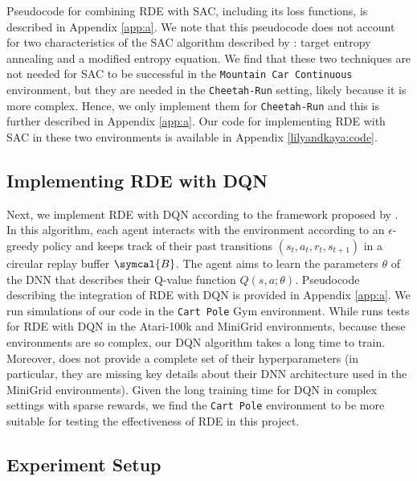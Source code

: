 \documentclass[base]{subfiles}
\begin{document}
Pseudocode for combining RDE with SAC, including its loss functions, is described in Appendix \ref{app:a}. 
We note that this pseudocode does not account for two characteristics of the SAC algorithm described by \cite{sac}: target entropy annealing and a modified entropy equation. 
We find that these two techniques are not needed for SAC to be successful in the \texttt{Mountain Car Continuous} environment, but they are needed in the \texttt{Cheetah-Run} setting, likely because it is more complex.
Hence, we only implement them for \texttt{Cheetah-Run} and this is further described in Appendix \ref{app:a}.
Our code for implementing RDE with SAC in these two environments is available in Appendix \ref{lilyandkaya:code}.

\subsection{Implementing RDE with DQN}

Next, we implement RDE with DQN according to the framework proposed by \cite{minh2015}.
In this algorithm, each agent interacts with the environment according to an $\epsilon$-greedy policy and keeps track of their past transitions $(s_t, a_t, r_t, s_{t+1})$ in a circular replay buffer $\symcal{B}$. 
The agent aims to learn the parameters $\theta$ of the DNN that describes their Q-value function $Q(s,a;\theta)$. 
Pseudocode describing the integration of RDE with DQN is provided in Appendix \ref{app:a}. 
We run simulations of our code in the \texttt{Cart Pole} Gym environment. 
While \cite{kim2023} runs tests for RDE with DQN in the Atari-100k and MiniGrid environments, because these environments are so complex, our DQN algorithm takes a long time to train.
Moreover, \cite{kim2023} does not provide a complete set of their hyperparameters (in particular, they are missing key details about their DNN architecture used in the MiniGrid environments). 
Given the long training time for DQN in complex settings with sparse rewards, we find the \texttt{Cart Pole} environment to be more suitable for testing the effectiveness of RDE in this project.

\subsection{Experiment Setup}
\label{ssec:setup}
\end{document}
